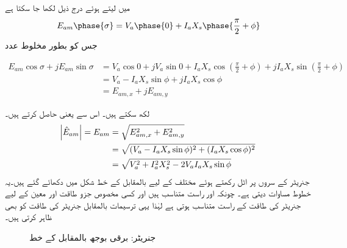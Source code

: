 میں  لیتے ہوئے درج ذیل لکھا جا سکتا ہے
\begin{align}
E_{am}\phase{\sigma}=V_a \phase{0} +I_a X_s \phase{\frac{\pi}{2}+\phi}
\end{align}
جس کو بطور مخلوط عدد
\begin{small}
\begin{align*}
E_{am} \cos \sigma +j E_{am} \sin \sigma&=V_a \cos 0+j V_a \sin 0 + I_a X_s \cos \left(\frac{\pi}{2}+\phi \right)+j I_a X_s \sin \left(\frac{\pi}{2}+\phi \right)\\
&=V_a  - I_a X_s \sin \phi+j I_a X_s \cos \phi\\
&=E_{am,x}+j E_{am,y}
\end{align*}
\end{small}
لکھ سکتے ہیں۔ اس  سے  یعنی    حاصل کرتے ہیں۔
\begin{gather}
\begin{aligned}\label{مساوات_معاصر_رو_بالمقابل_دباو}
\abs{\hat{E}_{am}}=E_{am}&=\sqrt{E_{am,x}^2+E_{am,y}^2}\\
&=\sqrt{(V_a  - I_a X_s \sin \phi)^2+(I_a X_s \cos \phi)^2}\\
&=\sqrt{V_a^2+I_a^2 X_s^2 -2 V_a I_a X_s \sin \phi}
\end{aligned}
\end{gather}
جنریٹر کے سروں پر   اٹل رکھتے ہوئے مختلف  کے لیے  بالمقابل  کے خط شکل   میں دکھائے گئے ہیں۔یہ خطوط مساوات  دیتی ہے۔ چونکہ   اور    راست متناسب ہیں اور کسی  مخصوص جزو طاقت اور معین  کے لیے جنریٹر کی طاقت  کے   راست متناسب ہوتی ہے لہٰذا یہی ترسیمات  بالمقابل جنریٹر کی طاقت کو بھی ظاہر کرتی ہیں۔
\begin{figure}
\centering
\caption{جنریٹر: برقی بوجھ بالمقابل  کے خط}
\label{شکل_معاصر_بار_بالمقابل_میدانی_رو}
\end{figure}
